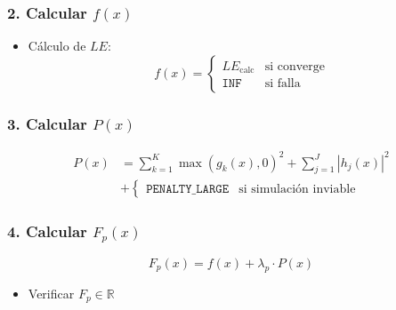\subsubsection*{2. Calcular $f(x)$}
\begin{itemize}
    \item Cálculo de $LE$:
    \begin{equation*}
        f(x) = \begin{cases}
        LE_{\text{calc}} & \text{si converge} \\
        \texttt{INF} & \text{si falla}
        \end{cases}
    \end{equation*}
\end{itemize}

\subsubsection*{3. Calcular $P(x)$}
\begin{align*}
    P(x) &= \sum_{k=1}^{K} {\max(g_k(x), 0)}^2 + \sum_{j=1}^{J} {|h_j(x)|}^2 \\
    &+ \begin{cases}
    \texttt{PENALTY\_LARGE} & \text{si simulación inviable}
    \end{cases}
\end{align*}

\subsubsection*{4. Calcular $F_p(x)$}
\begin{equation*}
    F_p(x) = f(x) + \lambda_p \cdot P(x)
\end{equation*}
\begin{itemize}
    \item Verificar $F_p \in \mathbb{R}$
\end{itemize}

